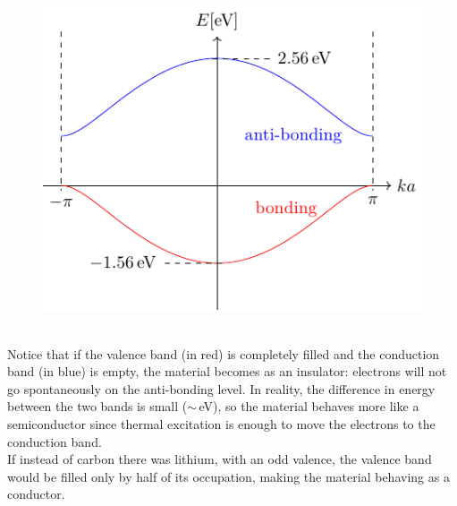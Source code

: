 \documentclass[10.75pt,a4paper,openright,bottom=2cm]{article}
\begin{document}
\begin{figure}[h]
    \centering
    \includegraphics{polybands.pdf}
    \label{fig:polybands}
\end{figure}\\
\noindent
Notice that if the valence band (in red) is completely filled and the conduction band (in blue) is empty, the material becomes as an insulator: electrons will not go spontaneously on the anti-bonding level. In reality, the difference in energy between the two bands is small ($\sim$\,eV), so the material behaves more like a semiconductor since thermal excitation is enough to move the electrons to the conduction band.\\
If instead of carbon there was lithium, with an odd valence, the valence band would be filled only by half of its occupation, making the material behaving as a conductor.
\newpage
\end{document}
